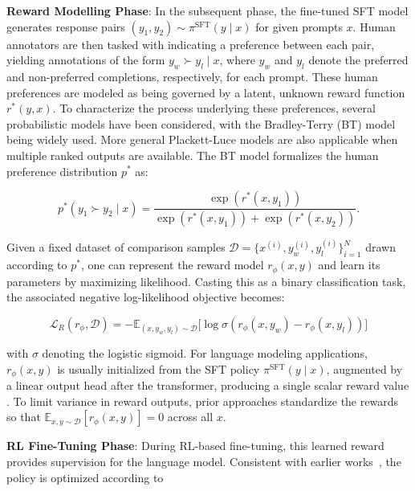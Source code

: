 \textbf{Reward Modelling Phase}: In the subsequent phase, the fine-tuned SFT model generates response pairs $(y_1, y_2)\sim \pi^\text{SFT}(y \mid x)$ for given prompts $x$. Human annotators are then tasked with indicating a preference between each pair, yielding annotations of the form $y_w\succ y_l \mid x$, where $y_w$ and $y_l$ denote the preferred and non-preferred completions, respectively, for each prompt. These human preferences are modeled as being governed by a latent, unknown reward function $r^*(y, x)$. To characterize the process underlying these preferences, several probabilistic models have been considered, with the Bradley-Terry (BT) model \cite{bradley1952rankanalysis} being widely used. More general Plackett-Luce models \citep{plackett1975analysis, luce2012individual} are also applicable when multiple ranked outputs are available. The BT model formalizes the human preference distribution $p^*$ as:

\begin{equation}\label{eq:bradley-terry}
    p^*(y_1\succ y_2 \mid x)=\frac{\exp\left(r^*(x, y_1)\right)}{\exp\left(r^*(x, y_1)\right) + \exp\left(r^*(x, y_2)\right)}.
\end{equation}

Given a fixed dataset of comparison samples $\mathcal{D}=\bigl\{x^{(i)}, y_w^{(i)}, y_l^{(i)}\bigr\}_{i=1}^N$ drawn according to $p^*$, one can represent the reward model $r_{\phi}(x, y)$ and learn its parameters by maximizing likelihood. Casting this as a binary classification task, the associated negative log-likelihood objective becomes:

\begin{equation}\label{eq:reward_model}
    \mathcal{L}_R(r_{\phi}, \mathcal{D}) = -\mathbb{E}_{(x, y_w, y_l)\sim \mathcal{D}}\bigl[\log \sigma(r_{\phi}(x, y_w)- r_{\phi}(x, y_l))\bigr]
\end{equation}

with $\sigma$ denoting the logistic sigmoid. For language modeling applications, $r_{\phi}(x, y)$ is usually initialized from the SFT policy $\pi^\text{SFT}(y \mid x)$, augmented by a linear output head after the transformer, producing a single scalar reward value \cite{ziegler2020finetuning}. To limit variance in reward outputs, prior approaches standardize the rewards so that $\mathbb{E}_{x,y\sim \mathcal{D}}\left[r_\phi(x, y)\right] = 0$ across all $x$.

\textbf{RL Fine-Tuning Phase}: During RL-based fine-tuning, this learned reward provides supervision for the language model. Consistent with earlier works~\citep{jaques2017sequence, jaques2020human}, the policy is optimized according to


